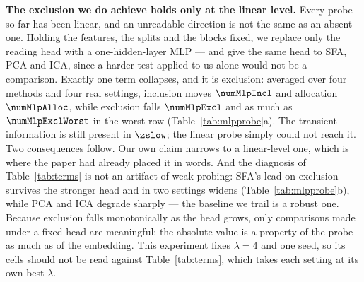 

\textbf{The exclusion we do achieve holds only at the linear level.} Every probe so far has been linear, and an unreadable direction is not the same as an absent one. Holding the features, the splits and the blocks fixed, we replace only the reading head with a one-hidden-layer MLP --- and give the same head to SFA, PCA and ICA, since a harder test applied to us alone would not be a comparison. Exactly one term collapses, and it is exclusion: averaged over four methods and four real settings, inclusion moves $\numMlpIncl$ and allocation $\numMlpAlloc$, while exclusion falls $\numMlpExcl$ and as much as $\numMlpExclWorst$ in the worst row (Table~\ref{tab:mlpprobe}a). The transient information is still present in $\zslow$; the linear probe simply could not reach it. Two consequences follow. Our own claim narrows to a linear-level one, which is where the paper had already placed it in words. And the diagnosis of Table~\ref{tab:terms} is not an artifact of weak probing: SFA's lead on exclusion survives the stronger head and in two settings widens (Table~\ref{tab:mlpprobe}b), while PCA and ICA degrade sharply --- the baseline we trail is a robust one. Because exclusion falls monotonically as the head grows, only comparisons made under a fixed head are meaningful; the absolute value is a property of the probe as much as of the embedding. This experiment fixes $\lambda=4$ and one seed, so its cells should not be read against Table~\ref{tab:terms}, which takes each setting at its own best $\lambda$.



